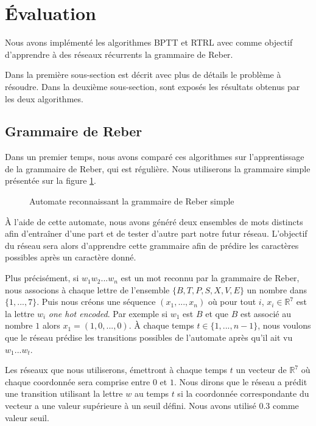 \section{Évaluation}

Nous avons implémenté les algorithmes BPTT et RTRL avec comme objectif d'apprendre à des réseaux récurrents la grammaire de Reber.

Dans la première sous-section est décrit avec plus de détails le problème à résoudre. Dans la deuxième sous-section, sont exposés les résultats obtenus par les deux algorithmes.

\subsection{Grammaire de Reber}

Dans un premier temps, nous avons comparé ces algorithmes sur l'apprentissage de la grammaire de Reber, qui est régulière. Nous utiliserons la grammaire simple présentée sur la figure \ref{Grammaire de Reber simple}.

\begin{figure}[h!]
\begin{center}

\caption{Automate reconnaissant la grammaire de Reber simple}
\label{Grammaire de Reber simple}
\end{center}
\end{figure}

À l'aide de cette automate, nous avons généré deux ensembles de mots distincts afin d'entraîner d'une part et de tester d'autre part notre futur réseau. L'objectif du réseau sera alors d'apprendre cette grammaire afin de prédire les caractères possibles après un caractère donné.

Plus précisément, si $w_1w_2...w_n$ est un mot reconnu par la grammaire de Reber, nous associons à chaque lettre de l'ensemble $\{B, T, P, S, X, V, E\}$ un nombre dans $\{1, ..., 7\}$. Puis nous créons une séquence $(x_1, ..., x_n)$ où pour tout $i$, $x_i \in \mathbb{R}^7$ est la lettre $w_i$ \textit{one hot encoded}. Par exemple si $w_1$ est $B$ et que $B$ est associé au nombre $1$ alors $x_1 = (1, 0, ..., 0)$. À chaque temps $t \in \{1, ..., n-1\}$, nous voulons que le réseau prédise les transitions possibles de l'automate après qu'il ait vu $w_1...w_t$.

Les réseaux que nous utiliserons, émettront à chaque temps $t$ un vecteur de $\mathbb{R}^7$ où chaque coordonnée sera comprise entre $0$ et $1$. Nous dirons que le réseau a prédit une transition utilisant la lettre $w$ au temps $t$ si la coordonnée correspondante du vecteur a une valeur supérieure à un seuil défini. Nous avons utilisé $0.3$ comme valeur seuil.


